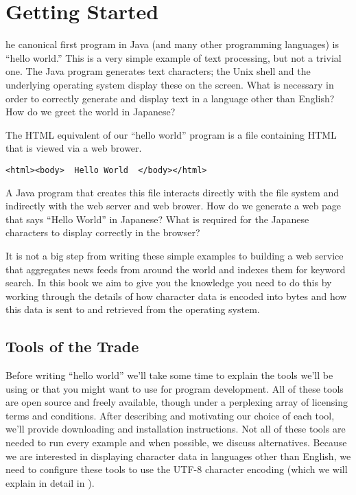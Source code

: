 \chapter{Getting Started}

he canonical first program in Java (and many
other programming languages) is ``hello world.''
%
%
This is a very simple example of text processing, but not a trivial one.
The Java program generates text characters; the Unix shell and the underlying
operating system display these on the screen.
What is necessary in order to correctly generate and display
text in a language other than English?
How do we greet the world in Japanese?

The HTML equivalent of our ``hello world'' program is a file containing
HTML that is viewed via a web brower.
\begin{verbatim}
<html><body>  Hello World  </body></html>
\end{verbatim}
A Java program that creates this file interacts directly with the file system
and indirectly with the web server and web brower.  How do we generate a web page 
that says ``Hello World'' in Japanese?  What is required 
for the Japanese characters to display correctly in the browser?

It is not a big step from writing these simple examples to building a web service
that aggregates news feeds from around the world and indexes them for keyword search.
In this book we aim to give you the knowledge you need to do this by working
through the details of how character data is encoded into bytes and how
this data is sent to and retrieved from the operating system.

\section{Tools of the Trade}

Before writing ``hello world'' 
we'll take some time to explain the tools we'll be using or that
you might want to use for program development.
All of these tools are open source and freely
available, though under a perplexing array of licensing terms and
conditions.  After describing and motivating our choice of each tool,
we'll provide downloading and installation instructions.
Not all of these tools are needed to run every example
and when possible, we discuss alternatives.
Because we are interested in displaying character data in languages
other than English, we need to configure these tools to use the
UTF-8 character encoding (which we will explain in detail in ).

